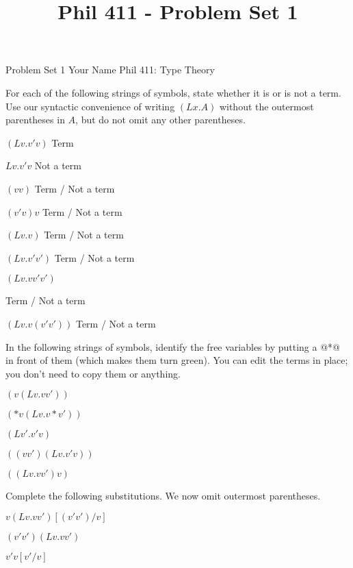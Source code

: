 
\title{Phil 411 - Problem Set 1}

\heading
Problem Set 1
Your Name
Phil 411: Type Theory
\endheading

For each of the following strings of symbols, state whether it is or is not a term. Use our syntactic convenience of writing $(Lx.A)$ without the outermost parentheses in $A$, but do not omit any other parentheses.

\problems
{}
$ (Lv.v'v) $
        \answer
        Term
        \endanswer

\problem{\gobble}
$ Lv.v'v $
        \answer
        Not a term
        \endanswer

$ (vv) $
        \answer
        Term / Not a term
        \endanswer

$ (v'v)v $
        \answer
        Term / Not a term
        \endanswer

$ (Lv.v) $
        \answer
        Term / Not a term
        \endanswer

$ (Lv.v'v') $
        \answer
        Term / Not a term
        \endanswer

$ (Lv.vv'v') $

        \answer
        Term / Not a term
        \endanswer

$ (Lv.v(v'v')) $
        \answer
        Term / Not a term
        \endanswer

\endproblems

\pagebreak

In the following strings of symbols, identify the free variables by putting a @*@ in front of them (which makes them turn green). You can edit the terms in place; you don't need to copy them or anything.

\problems
{}
$ (v(Lv.vv')) $

\negskip
{}
$ (*v(Lv.v*v')) $

$ (Lv'.v'v) $

$ ((vv')(Lv.v'v)) $

$ ((Lv.vv')v) $

\endproblems

Complete the following substitutions. We now omit outermost parentheses.

\problems
{}
$ v(Lv.vv')[(v'v')/v] $

	\answer
	$ (v'v')(Lv.vv') $
	\endanswer

$ v'v[v'/v] $

